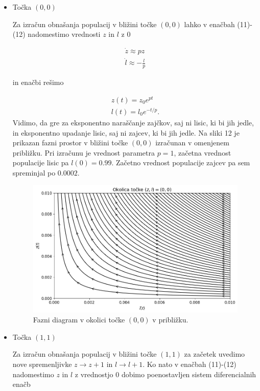 \documentclass[slovene,11pt,a4paper]{article}
\begin{document}
\begin{itemize}
\item Točka $(0,0)$

Za izračun obnašanja populacij v bližini točke $(0,0)$ lahko v enačbah (11)-(12) nadomestimo vrednosti $z$ in $l$ z 0

\begin{align}
\dot{z} \approx pz \\
\dot{l} \approx - \frac{l}{p}
\end{align}

in enačbi rešimo

\begin{align}
z(t) = z_0 e^{pt} \\
l(t) = l_0 e^{-t/p}.
\end{align}
Vidimo, da gre za eksponentno naraščanje zajčkov, saj ni lisic, ki bi jih jedle, in eksponentno upadanje lisic, saj ni zajcev, ki bi jih jedle. Na sliki 12 je prikazan fazni prostor v bližini točke $(0,0)$ izračunan v omenjenem približku. Pri izračunu je vrednost parametra $p=1$, začetna vrednost populacije lisic pa $l(0) = 0.99$. Začetno vrednost populacije zajcev pa sem spreminjal po $0.0002$.

\begin{figure}[h!]
\centering
\includegraphics[width=13.5cm]{zajci4.png}
\caption{Fazni diagram v okolici točke $(0,0)$ v približku.}
\end{figure}

\item Točka $(1,1)$

Za izračun obnašanja populacij v bližini točke $(1,1)$ za začetek uvedimo nove spremenljivke $z \rightarrow z+1$ in $l \rightarrow l+1$. Ko nato v enačbah (11)-(12) nadomestimo $z$ in $l$ z vrednostjo $0$ dobimo poenostavljen sistem diferencialnih enačb


\end{itemize}
\end{document}
